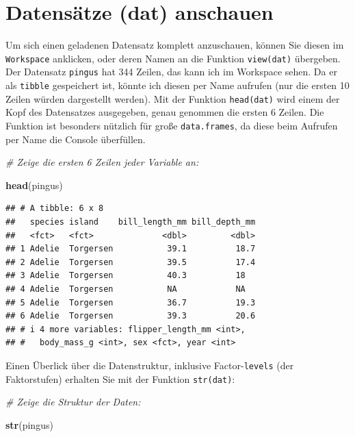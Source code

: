 \documentclass[
  ngerman,
]{book}
\newenvironment{Shaded}{\begin{snugshade}}{\end{snugshade}}
\newcommand{\CommentTok}[1]{\textcolor[rgb]{0.56,0.35,0.01}{\textit{#1}}}
\newcommand{\FunctionTok}[1]{\textcolor[rgb]{0.13,0.29,0.53}{\textbf{#1}}}
\newcommand{\NormalTok}[1]{#1}
\begin{document}
\section{Datensätze (dat) anschauen}\label{datensuxe4tze-dat-anschauen}

Um sich einen geladenen Datensatz komplett anzuschauen, können Sie diesen im \texttt{Workspace} anklicken, oder deren Namen an die Funktion \texttt{view(dat)} übergeben. Der Datensatz \texttt{pingus} hat 344 Zeilen, das kann ich im Workspace sehen. Da er als \texttt{tibble} gespeichert ist, könnte ich diesen per Name aufrufen (nur die ersten 10 Zeilen würden dargestellt werden). Mit der Funktion \texttt{head(dat)} wird einem der Kopf des Datensatzes ausgegeben, genau genommen die ersten 6 Zeilen. Die Funktion ist besonders nützlich für große \texttt{data.frames}, da diese beim Aufrufen per Name die Console überfüllen.

\begin{Shaded}
\begin{Highlighting}[]
\CommentTok{\# Zeige die ersten 6 Zeilen jeder Variable an:}

\FunctionTok{head}\NormalTok{(pingus)}
\end{Highlighting}
\end{Shaded}

\begin{verbatim}
## # A tibble: 6 x 8
##   species island    bill_length_mm bill_depth_mm
##   <fct>   <fct>              <dbl>         <dbl>
## 1 Adelie  Torgersen           39.1          18.7
## 2 Adelie  Torgersen           39.5          17.4
## 3 Adelie  Torgersen           40.3          18  
## 4 Adelie  Torgersen           NA            NA  
## 5 Adelie  Torgersen           36.7          19.3
## 6 Adelie  Torgersen           39.3          20.6
## # i 4 more variables: flipper_length_mm <int>,
## #   body_mass_g <int>, sex <fct>, year <int>
\end{verbatim}

Einen Überlick über die Datenstruktur, inklusive Factor-\texttt{levels} (der Faktorstufen) erhalten Sie mit der Funktion \texttt{str(dat)}:

\begin{Shaded}
\begin{Highlighting}[]
\CommentTok{\# Zeige die Struktur der Daten:}

\FunctionTok{str}\NormalTok{(pingus)}
\end{Highlighting}
\end{Shaded}
\end{document}
